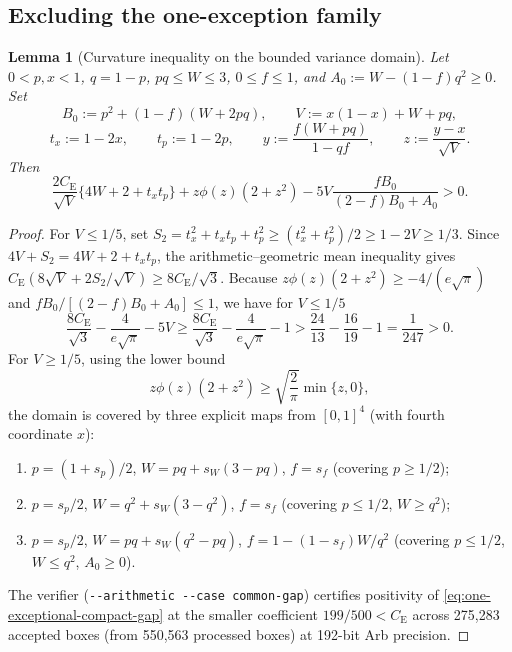\documentclass[11pt]{article}
\numberwithin{equation}{section}
\newtheorem{lemma}[theorem]{Lemma}
\theoremstyle{definition}
\theoremstyle{remark}
\newcommand{\be}{C_{\mathrm E}}
\newcommand{\ph}{\phi}
\begin{document}
\subsection{Excluding the one-exception family}

\begin{samepage}
\begin{lemma}[Curvature inequality on the bounded variance domain]
\label{lem:one-exceptional-compact}
Let $0<p,x<1$, $q=1-p$, $pq\leq W\leq3$, $0\leq f\leq1$, and
$A_0:=W-(1-f)q^2\geq0$. Set
\[
 B_0:=p^2+(1-f)(W+2pq),\qquad
 V:=x(1-x)+W+pq,
\]
\[
 t_x:=1-2x,\qquad t_p:=1-2p,\qquad
 y:=\frac{f(W+pq)}{1-qf},\qquad z:=\frac{y-x}{\sqrt V}.
\]
Then
\begin{equation}
 \frac{2\be}{\sqrt V}\{4W+2+t_xt_p\}
 +z\ph(z)(2+z^2)
 -5V\frac{fB_0}{(2-f)B_0+A_0}>0.
 \label{eq:one-exceptional-compact-gap}
\end{equation}
\end{lemma}
\end{samepage}

\begin{proof}
For $V\leq1/5$, set $S_2=t_x^2+t_xt_p+t_p^2\ge(t_x^2+t_p^2)/2\ge1-2V\ge1/3$.
Since $4V+S_2=4W+2+t_xt_p$, the arithmetic--geometric mean inequality gives
$\be(8\sqrt V+2S_2/\sqrt V)\ge8\be/\sqrt3$. Because $z\ph(z)(2+z^2)\ge-4/(e\sqrt\pi)$
and $fB_0/[(2-f)B_0+A_0]\le1$, we have for $V\le1/5$
\begin{equation}
 \frac{8\be}{\sqrt3}-\frac4{e\sqrt\pi}-5V
 \ge\frac{8\be}{\sqrt3}-\frac4{e\sqrt\pi}-1
 >\frac{24}{13}-\frac{16}{19}-1=\frac1{247}>0.
 \label{eq:one-exceptional-small-variance-margin}
\end{equation}
For $V\geq1/5$, using the lower bound
\begin{equation}
 z\ph(z)(2+z^2)\geq\sqrt{\frac2\pi}\min\{z,0\},
 \label{eq:one-exceptional-normal-lower}
\end{equation}
the domain is covered by three explicit maps from $[0,1]^4$ (with fourth
coordinate $x$):
\begin{enumerate}[label=(\roman*),leftmargin=2em]
\item $p=(1+s_p)/2$, $W=pq+s_W(3-pq)$, $f=s_f$ (covering $p\ge1/2$);
\item $p=s_p/2$, $W=q^2+s_W(3-q^2)$, $f=s_f$ (covering $p\le1/2$, $W\ge q^2$);
\item $p=s_p/2$, $W=pq+s_W(q^2-pq)$, $f=1-(1-s_f)W/q^2$ (covering $p\le1/2$,
$W\le q^2$, $A_0\ge0$).
\end{enumerate}
The verifier  (\verb|--arithmetic --case common-gap|)
certifies positivity of \eqref{eq:one-exceptional-compact-gap} at the smaller
coefficient $199/500<\be$ across 275,283 accepted boxes (from 550,563
processed boxes) at 192-bit Arb precision.
\end{proof}
\end{document}

